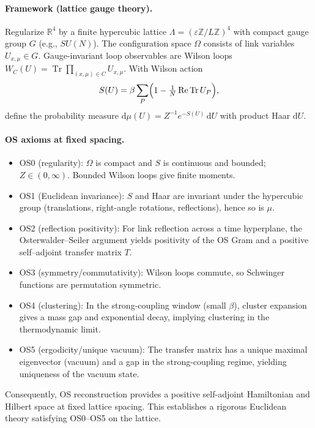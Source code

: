 \documentclass[11pt]{amsart}
\theoremstyle{plain}
\theoremstyle{definition}
\theoremstyle{remark}
\begin{document}
\paragraph{Framework (lattice gauge theory).}
Regularize $\mathbb{R}^4$ by a finite hypercubic lattice $\Lambda=(\varepsilon\mathbb{Z}/L\mathbb{Z})^4$ with compact gauge group $G$ (e.g., $SU(N)$). The configuration space $\Omega$ consists of link variables $U_{x,\mu}\in G$. Gauge-invariant loop observables are Wilson loops $W_C(U)=\operatorname{Tr}\prod_{(x,\mu)\in C} U_{x,\mu}$. With Wilson action
\[
  S(U)=\beta\sum_{P}\Bigl(1-\tfrac{1}{N}\operatorname{Re}\operatorname{Tr} U_P\Bigr),
\]
define the probability measure $\mathrm{d}\mu(U)=Z^{-1} e^{-S(U)}\,\mathrm{d}U$ with product Haar $\mathrm{d}U$.

\paragraph{OS axioms at fixed spacing.}
\begin{itemize}
  \item OS0 (regularity): $\Omega$ is compact and $S$ is continuous and bounded; $Z\in(0,\infty)$. Bounded Wilson loops give finite moments.
  \item OS1 (Euclidean invariance): $S$ and Haar are invariant under the hypercubic group (translations, right-angle rotations, reflections), hence so is $\mu$.
  \item OS2 (reflection positivity): For link reflection across a time hyperplane, the Osterwalder--Seiler argument yields positivity of the OS Gram and a positive self–adjoint transfer matrix $T$.
  \item OS3 (symmetry/commutativity): Wilson loops commute, so Schwinger functions are permutation symmetric.
  \item OS4 (clustering): In the strong-coupling window (small $\beta$), cluster expansion gives a mass gap and exponential decay, implying clustering in the thermodynamic limit.
  \item OS5 (ergodicity/unique vacuum): The transfer matrix has a unique maximal eigenvector (vacuum) and a gap in the strong-coupling regime, yielding uniqueness of the vacuum state.
\end{itemize}
Consequently, OS reconstruction provides a positive self-adjoint Hamiltonian and Hilbert space at fixed lattice spacing. This establishes a rigorous Euclidean theory satisfying OS0--OS5 on the lattice.
\end{document}
